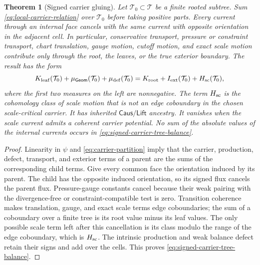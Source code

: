 \documentclass[11pt]{article}
\numberwithin{section}{part}
\theoremstyle{plain}
\newtheorem{theorem}{Theorem}[section]
\theoremstyle{definition}
\theoremstyle{remark}
\newcommand{\Geom}{\mathsf{Geom}}
\newcommand{\Caus}{\mathsf{Caus}}
\newcommand{\Lift}{\mathsf{Lift}}
\begin{document}
\begin{theorem}[Signed carrier gluing]
\label{thm:signed-carrier-gluing}
Let \(\mathcal T_0\subset\mathcal T\) be a finite rooted subtree.  Sum
\eqref{eq:local-carrier-relation} over \(\mathcal T_0\) before taking positive
parts.  Every current through an internal face cancels with the same current
with opposite orientation in the adjacent cell.  In particular, conservative
transport, pressure or constraint transport, chart translation, gauge
motion, cutoff motion, and exact scale motion contribute only through the
root, the leaves, or the true exterior boundary.  The result has the form
\begin{equation}
 \label{eq:signed-carrier-tree-balance}
 K_{\rm leaf}(\mathcal T_0)
 +\mu_{\Geom}(\mathcal T_0)
 +\mu_{\rm def}(\mathcal T_0)
 =K_{\rm root}
 +I_{\rm ext}(\mathcal T_0)
 +H_{\rm sc}(\mathcal T_0),
\end{equation}
where the first two measures on the left are nonnegative.  The term
\(H_{\rm sc}\) is the cohomology class of scale motion that is not an edge
coboundary in the chosen scale-critical carrier.  It has inherited
\(\Caus/\Lift\) ancestry.  It vanishes when the scale current admits a
coherent carrier potential.  No sum of the absolute values of the internal
currents occurs in \eqref{eq:signed-carrier-tree-balance}.
\end{theorem}

\begin{proof}
Linearity in \(\psi\) and \eqref{eq:carrier-partition} imply that the carrier,
production, defect, transport, and exterior terms of a parent are the sums of
the corresponding child terms.  Give every common face the orientation
induced by its parent.  The child has the opposite induced orientation, so
its signed flux cancels the parent flux.  Pressure-gauge constants cancel
because their weak pairing with the divergence-free or constraint-compatible
test is zero.  Transition coherence makes translation, gauge, and exact scale
terms edge coboundaries; the sum of a coboundary over a finite tree is its
root value minus its leaf values.  The only possible scale term left after
this cancellation is its class modulo the range of the edge coboundary,
which is \(H_{\rm sc}\).  The intrinsic production and weak balance defect
retain their signs and add over the cells.  This proves
\eqref{eq:signed-carrier-tree-balance}.
\end{proof}
\end{document}
